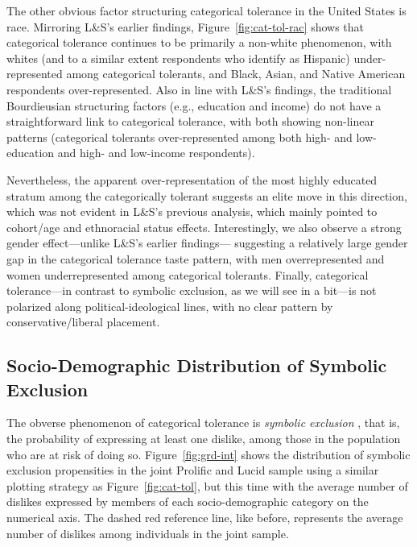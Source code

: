 \documentclass[12pt]{article}
\begin{document}
The other obvious factor structuring categorical tolerance in the United States is race. Mirroring L\&S's earlier findings, Figure~\ref{fig:cat-tol-rac} shows that categorical tolerance continues to be primarily a non-white phenomenon, with whites (and to a similar extent respondents who identify as Hispanic) under-represented among categorical tolerants, and Black, Asian, and Native American respondents over-represented. Also in line with L\&S's findings, the traditional Bourdieusian structuring factors (e.g., education and income) do not have a straightforward link to categorical tolerance, with both showing non-linear patterns (categorical tolerants over-represented among both high- and low-education and high- and low-income respondents). 

Nevertheless, the apparent over-representation of the most highly educated stratum among the categorically tolerant suggests an elite move in this direction, which was not evident in L\&S's previous analysis, which mainly pointed to cohort/age and ethnoracial status effects. Interestingly, we also observe a strong gender effect---unlike L\&S's earlier findings--- suggesting a relatively large gender gap in the categorical tolerance taste pattern, with men overrepresented and women underrepresented among categorical tolerants. Finally, categorical tolerance---in contrast to symbolic exclusion, as we will see in a bit---is not polarized along political-ideological lines, with no clear pattern by conservative/liberal placement. 

\subsection*{Socio-Demographic Distribution of Symbolic Exclusion}
The obverse phenomenon of categorical tolerance is \emph{symbolic exclusion} \citep{bryson1996anything-311}, that is, the probability of expressing at least one dislike, among those in the population who are at risk of doing so. Figure~\ref{fig:grd-int} shows the distribution of symbolic exclusion propensities in the joint Prolific and Lucid sample using a similar plotting strategy as Figure~\ref{fig:cat-tol}, but this time with the average number of dislikes expressed by members of each socio-demographic category on the numerical axis. The dashed red reference line, like before, represents the average number of dislikes among individuals in the joint sample. 
\end{document}
